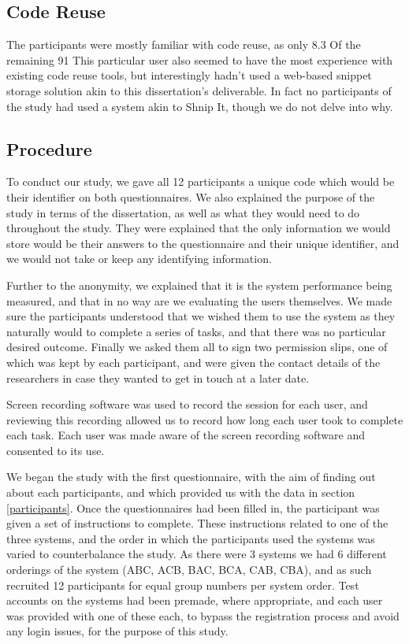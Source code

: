 \subsection{Code Reuse}
The participants were mostly familiar with code reuse, as only 8.3%
Of the remaining 91%
This particular user also seemed to have the most experience with existing code reuse tools, but interestingly hadn't used a web-based snippet storage solution akin to this dissertation's deliverable.
In fact no participants of the study had used a system akin to Shnip It, though we do not delve into why.

\subsection{Procedure}
To conduct our study, we gave all 12 participants a unique code which would be their identifier on both questionnaires. 
We also explained the purpose of the study in terms of the dissertation, as well as what they would need to do throughout the study. 
They were explained that the only information we would store would be their answers to the questionnaire and their unique identifier, and we would not take or keep any identifying information.

Further to the anonymity, we explained that it is the system performance being measured, and that in no way are we evaluating the users themselves.
We made sure the participants understood that we wished them to use the system as they naturally would to complete a series of tasks, and that there was no particular desired outcome. 
Finally we asked them all to sign two permission slips, one of which was kept by each participant, and were given the contact details of the researchers in case they wanted to get in touch at a later date.

Screen recording software was used to record the session for each user, and reviewing this recording allowed us to record how long each user took to complete each task.
Each user was made aware of the screen recording software and consented to its use.

We began the study with the first questionnaire, with the aim of finding out about each participants, and which provided us with the data in section \ref{participants}.
Once the questionnaires had been filled in, the participant was given a set of instructions to complete.
These instructions related to one of the three systems, and the order in which the participants used the systems was varied to counterbalance the study.
As there were 3 systems we had 6 different orderings of the system (ABC, ACB, BAC, BCA, CAB, CBA), and as such recruited 12 participants for equal group numbers per system order.
Test accounts on the systems had been premade, where appropriate, and each user was provided with one of these each, to bypass the registration process and avoid any login issues, for the purpose of this study.

